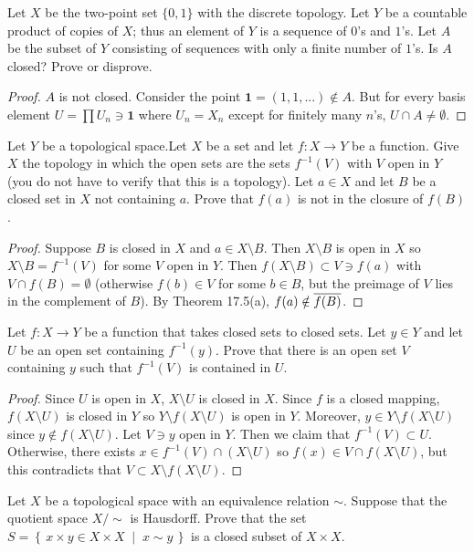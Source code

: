 \begin{problem}
Let $X$ be the two-point set $\{0,1\}$ with the discrete
topology. Let $Y$ be a countable product of copies of $X$; thus
an element of $Y$ is a sequence of $0$'s and $1$'s. Let $A$ be
the subset of $Y$ consisting of sequences with only a finite
number of $1$'s. Is $A$ closed? Prove or disprove.
\end{problem}
\begin{proof}
$A$ is not closed. Consider the point $\mathbf{1}=(1,1,...)\notin
A$. But for every basis element $U=\prod U_n\ni\mathbf{1}$ where
$U_n=X_n$ except for finitely many $n$'s, $U\cap A\neq\emptyset$.
\end{proof}
\begin{problem}
Let $Y$ be a topological space.Let $X$ be a set and let $f\colon
X\to Y$ be a function. Give $X$ the topology in which the open
sets are the sets $f^{-1}(V)$ with $V$ open in $Y$ (you do not
have to verify that this is a topology). Let $a\in X$ and let $B$
be a closed set in $X$ not containing $a$. Prove that $f(a)$ is
not in the closure of $f(B)$.
\end{problem}
\begin{proof}
Suppose $B$ is closed in $X$ and $a\in X\setminus B$. Then
$X\setminus B$ is open in $X$ so $X\setminus B=f^{-1}(V)$ for
some $V$ open in $Y$. Then $f(X\setminus B)\subset V\ni f(a)$
with $V\cap f(B)=\emptyset$ (otherwise $f(b)\in V$ for some $b\in
B$, but the preimage of $V$ lies in the complement of $B$). By
Theorem 17.5(a), $f(a)\notin\overline{f(B)}$.
\end{proof}
\begin{problem}
Let $f\colon X\to Y$ be a function that takes closed sets to
closed sets. Let $y\in Y$ and let $U$ be an open set containing
$f^{-1}(y)$. Prove that there is an open set $V$ containing $y$
such that $f^{-1}(V)$ is contained in $U$.
\end{problem}
\begin{proof}
Since $U$ is open in $X$, $X\setminus U$ is closed in $X$. Since
$f$ is a closed mapping, $f(X\setminus U)$ is closed in $Y$ so
$Y\setminus f(X\setminus U)$ is open in $Y$. Moreover, $y\in
Y\setminus f(X\setminus U)$ since $y\notin f(X\setminus U)$. Let
$V\ni y$ open in $Y$. Then we claim that $f^{-1}(V)\subset
U$. Otherwise, there exists $x\in f^{-1}(V)\cap(X\setminus U)$ so
$f(x)\in V\cap f(X\setminus U)$, but this contradicts that
$V\subset X\setminus f(X\setminus U)$.
\end{proof}
\begin{problem}
Let $X$ be a topological space with an equivalence relation
$\sim$. Suppose that the quotient space $X/{\sim}$ is
Hausdorff. Prove that the set $S=\left\{\,x\times y\in X\times
  X\;\middle|\;x\sim y\,\right\}$ is a closed subset of $X\times
X$.
\end{problem}
